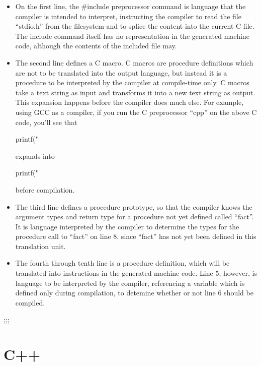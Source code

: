  \begin{itemize}
  \item
     On the first line, the \#include preprocessor command
     is language that the compiler
     is intended to interpret, instructing the compiler to
     read the file ``stdio.h''
     from the filesystem and to splice the content
     into the current C file.  The include command
     itself has no representation in the generated machine code, although the contents
     of the included file may.

  \item
     The second line defines a C macro. C macros are procedure definitions which
      are not to be translated into the output language, but instead it is a procedure
     to be interpreted by the compiler
     at compile-time only.  C macros take a text
     string as input and transforms it into a new text string as output.
     This expansion happens before the compiler does much
     else.  For example, using GCC as a compiler, if you run the C preprocessor
     ``cpp'' on the above C code, you'll see that

     \begin{examplecode}
  printf("%
     \end{examplecode}

     \noindent expands into

     \begin{examplecode}
  printf("%
     \end{examplecode}

     \noindent before compilation.

  \item
     The third line defines a procedure prototype, so that
     the compiler knows the argument types and return type for a procedure not
     yet defined called ``fact''.
     It is language interpreted by the compiler to determine the types for the procedure
     call to ``fact'' on line 8, since ``fact'' has not yet been defined in this
     translation unit.
  \item
     The fourth through tenth line is a procedure definition, which will be
     translated into instructions in the generated machine code.  Line 5, however, is language
     to be interpreted by the compiler, referencing a variable which is defined
     only during compilation, to detemine whether or not line 6 should be
     compiled.
 \end{itemize}
;;;
 \section{C++}


